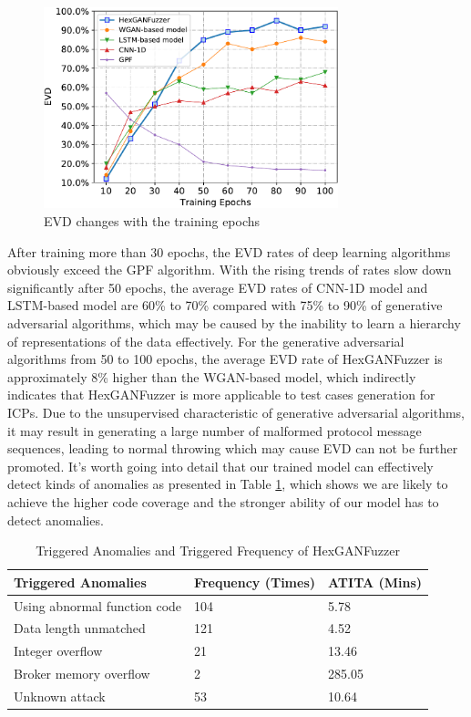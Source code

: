 \begin{figure}[t]
	\centering
	\includegraphics[width=3.36in]{FIGURE_EVD.pdf}
	\caption{EVD changes with the training epochs}
	\label{FIGURE_EVD}
\end{figure}
After training more than 30 epochs, the EVD rates of deep learning algorithms obviously exceed the GPF algorithm. With the rising trends of rates slow down significantly after 50 epochs, the average EVD rates of CNN-1D model and LSTM-based model are 60\% to 70\% compared with 75\% to 90\% of generative adversarial algorithms, which may be caused by the inability to learn a hierarchy of representations of the data effectively. For the generative adversarial algorithms from 50 to 100 epochs, the average EVD rate of HexGANFuzzer is approximately 8\% higher than the WGAN-based model, which indirectly indicates that HexGANFuzzer is more applicable to test cases generation for ICPs. Due to the unsupervised characteristic of generative adversarial algorithms, it may result in generating a large number of malformed protocol message sequences, leading to normal throwing which may cause EVD can not be further promoted. It's worth going into detail that our trained model can effectively detect kinds of anomalies as presented in Table \ref{Triggered_Anomalies_HexGANFuzzer}, which shows we are likely to achieve the higher code coverage and the stronger ability of our model has to detect anomalies.
\begin{table}[htbp]
	\caption{Triggered Anomalies and Triggered Frequency of HexGANFuzzer}
	\label{Triggered_Anomalies_HexGANFuzzer}
	\centering
	\begin{tabular}{m{100pt}<{\centering}  m{40pt}<{\centering} m{50pt}<{\centering} }
		\toprule
		\bfseries Triggered Anomalies &  \bfseries Frequency (Times) & \bfseries ATITA (Mins)\\
		\midrule
		Using abnormal function code & 104 & 5.78\\
		Data length unmatched & 121 & 4.52\\
		Integer overflow & 21 & 13.46 \\
		Broker memory overflow & 2 & 285.05 \\
		Unknown attack & 53 &10.64\\
		\bottomrule
	\end{tabular}
\end{table}

